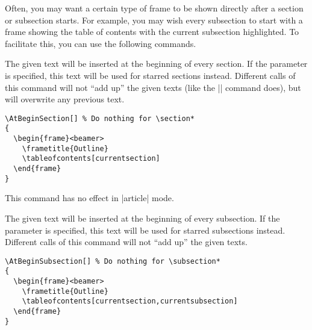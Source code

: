 Often, you may want a certain type of frame to be shown directly after a section or subsection starts. For example, you may wish every subsection to start with a frame showing the table of contents with the current subsection highlighted. To facilitate this, you can use the following commands.

\begin{command}{\AtBeginSection{}}
  The given text will be inserted at the beginning of every section. If the  parameter is specified, this text will be used for starred sections instead. Different calls of this command will not ``add up'' the given texts (like the |\AtBeginDocument| command does), but will overwrite any previous text.

  \example
\begin{Verbatim}
\AtBeginSection[] % Do nothing for \section*
{
  \begin{frame}<beamer>
    \frametitle{Outline}
    \tableofcontents[currentsection]
  \end{frame}
}
\end{Verbatim}

  \articlenote
  This command has no effect in |article| mode.

\end{command}

\begin{command}{\AtBeginSubsection{}}
  The given text will be inserted at the beginning of every subsection. If the  parameter is specified, this text will be used for starred subsections instead. Different calls of this command will not ``add up'' the given texts.

  \example
\begin{Verbatim}
\AtBeginSubsection[] % Do nothing for \subsection*
{
  \begin{frame}<beamer>
    \frametitle{Outline}
    \tableofcontents[currentsection,currentsubsection]
  \end{frame}
}
\end{Verbatim}
\end{command}

